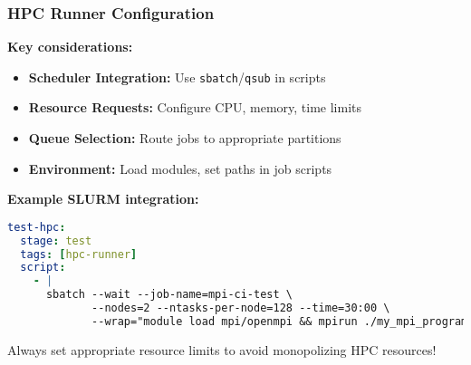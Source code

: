 \begin{frame}[fragile]
	\frametitle{HPC Runner Configuration}
	\textbf{Key considerations:}
	\begin{itemize}
		\item \textbf{Scheduler Integration:} Use \texttt{sbatch}/\texttt{qsub} in scripts
		\item \textbf{Resource Requests:} Configure CPU, memory, time limits
		\item \textbf{Queue Selection:} Route jobs to appropriate partitions
		\item \textbf{Environment:} Load modules, set paths in job scripts
	\end{itemize}
	\pause
	\textbf{Example SLURM integration:}
	\begin{lstlisting}[language=yaml, style=Shell]
test-hpc:
  stage: test
  tags: [hpc-runner]
  script:
    - |
      sbatch --wait --job-name=mpi-ci-test \
             --nodes=2 --ntasks-per-node=128 --time=30:00 \
             --wrap="module load mpi/openmpi && mpirun ./my_mpi_program"
	\end{lstlisting}
	\pause
	\begin{warning}
		{Always set appropriate resource limits to avoid monopolizing HPC resources!}
	\end{warning}
\end{frame}

